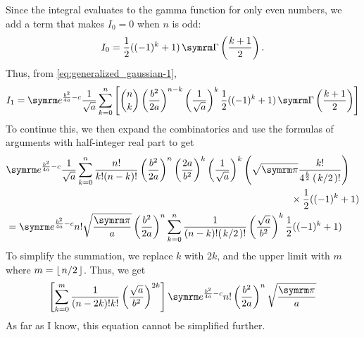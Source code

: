 Since the integral evaluates to the gamma function for only even numbers, we add a term that makes $I_0 = 0$ when $n$ is odd:
\begin{equation}
    I_0 = \frac{1}{2}((-1)^k + 1)\fgamma\left(\frac{k + 1}{2}\right).
\end{equation}
Thus, from \cref{eq:generalized_gaussian-1},
\begin{equation}
    I_1 = \e^{\frac{b^2}{4a} - c}\frac{1}{\sqrt{a}}\sum_{k = 0}^{n}\left[{n \choose k}\left(\frac{b^2}{2a}\right)^{n - k}\left(\frac{1}{\sqrt{a}}\right)^{k} \frac{1}{2}((-1)^k + 1)\fgamma\left(\frac{k + 1}{2}\right)\right]
\end{equation}
To continue this, we then expand the combinatorics and use the formulas of arguments with half-integer real part to get
\begin{align}
    &\begin{multlined}
    \e^{\frac{b^2}{4a} - c}\frac{1}{\sqrt{a}}\sum_{k = 0}^{n}\frac{n!}{k!(n - k)!}\left(\frac{b^2}{2a}\right)^n\left(\frac{2a}{b^2}\right)^k\left(\frac{1}{\sqrt{a}}\right)^k\left(\sqrt{\cpi}\frac{k!}{4^{\frac{k}{2}}\left(\flatfrac{k}{2}\right)!}\right) \\
    \times \frac{1}{2}((-1)^k + 1)
    \end{multlined} \\
    &= \e^{\frac{b^2}{4a} - c}n!\sqrt{\frac{\cpi}{a}}\left(\frac{b^2}{2a}\right)^n\sum_{k = 0}^n\frac{1}{(n - k)!(\flatfrac{k}{2})!}\left(\frac{\sqrt{a}}{b^2}\right)^{k}\frac{1}{2}((-1)^k + 1)
\end{align}
To simplify the summation, we replace $k$ with $2k$, and the upper limit with $m$ where $m = \left\lfloor\flatfrac{n}{2}\right\rfloor$. Thus, we get
\begin{equation}
    \left[\sum_{k = 0}^{m}\frac{1}{(n - 2k)!k!}\left(\frac{\sqrt{a}}{b^2}\right)^{2k}\right]\e^{\frac{b^2}{4a} - c}n!\left(\frac{b^2}{2a}\right)^n\sqrt{\frac{\cpi}{a}}
\end{equation}
As far as I know, this equation cannot be simplified further.

